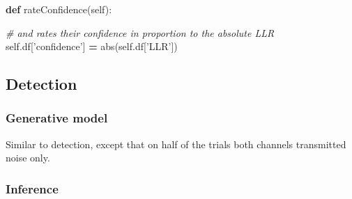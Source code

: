 \documentclass[12pt,twoside]{reedthesis}
\newenvironment{Shaded}{\begin{snugshade}}{\end{snugshade}}
\newcommand{\BuiltInTok}[1]{#1}
\newcommand{\CommentTok}[1]{\textcolor[rgb]{0.56,0.35,0.01}{\textit{#1}}}
\newcommand{\KeywordTok}[1]{\textcolor[rgb]{0.13,0.29,0.53}{\textbf{#1}}}
\newcommand{\NormalTok}[1]{#1}
\newcommand{\OperatorTok}[1]{\textcolor[rgb]{0.81,0.36,0.00}{\textbf{#1}}}
\newcommand{\StringTok}[1]{\textcolor[rgb]{0.31,0.60,0.02}{#1}}
\newcommand{\VariableTok}[1]{\textcolor[rgb]{0.00,0.00,0.00}{#1}}
\begin{document}
\begin{Shaded}
\begin{Highlighting}[]
    \KeywordTok{def}\NormalTok{ rateConfidence(}\VariableTok{self}\NormalTok{):}
        
        \CommentTok{# and rates their confidence in proportion to the absolute LLR}
        \VariableTok{self}\NormalTok{.df[}\StringTok{'confidence'}\NormalTok{] }\OperatorTok{=} \BuiltInTok{abs}\NormalTok{(}\VariableTok{self}\NormalTok{.df[}\StringTok{'LLR'}\NormalTok{])}
\end{Highlighting}
\end{Shaded}
\hypertarget{detection-2}{%
\subsection{Detection}\label{detection-2}}

\hypertarget{generative-model-1}{%
\subsubsection*{Generative model}\label{generative-model-1}}

Similar to detection, except that on half of the trials both channels transmitted noise only.

\hypertarget{inference-1}{%
\subsubsection*{Inference}\label{inference-1}}
\end{document}
